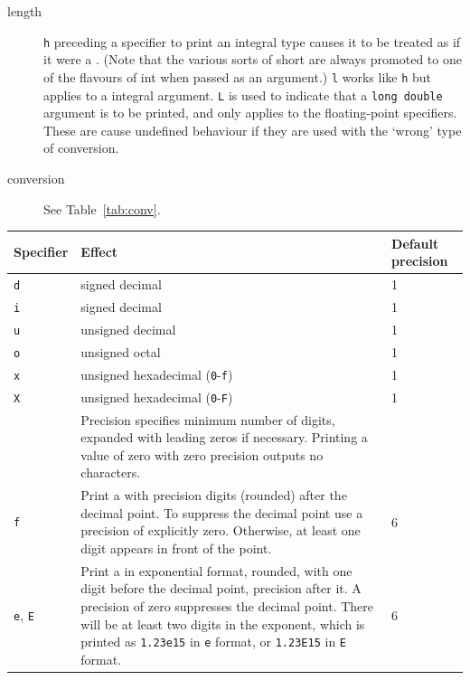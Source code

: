 \begin{description}
   \item[length] \texttt{h} preceding a specifier to print an integral type  causes
    it  to  be treated as if it were a \short.  (Note that the
    various sorts of short are always promoted to one of  the flavours of int
    when passed as an argument.) \texttt{l} works like \texttt{h} but
    applies to a \klong{} integral argument.  \texttt{L} is used
    to indicate  that  a  \texttt{long double} argument is to be printed,
    and only applies to the floating-point specifiers.  These are  cause
    undefined behaviour if they are used with the `wrong' type of
    conversion.

   \item[conversion] See Table~\ref{tab:conv}.
   \end{description}

   \begin{table}[htb]
     \centering
     \begin{tabular}{lp{}p{}}
       \toprule
        Specifier & Effect & Default precision    \\
        \midrule
        \texttt{d} & signed decimal & 1    \\
        \texttt{i} & signed decimal & 1    \\
        \texttt{u} & unsigned decimal & 1    \\
        \texttt{o} & unsigned octal & 1    \\
        \texttt{x} & unsigned hexadecimal (\texttt{0}-\texttt{f}) & 1    \\
        \texttt{X} & unsigned hexadecimal (\texttt{0}-\texttt{F}) & 1    \\
                  & Precision specifies minimum number of digits, expanded
                    with leading zeros if necessary.  Printing a value
                    of zero with zero precision outputs no characters. &     \\
        \texttt{f} & Print a \double{} with precision
                     digits (rounded) after the decimal point.  To suppress
                     the decimal point use a precision of explicitly zero.
                     Otherwise, at least one digit
                     appears in front of the point. & 6    \\

        \texttt{e},
        \texttt{E} & Print a \double{} in exponential format,
                     rounded, with one digit before the decimal point,
                     precision after it.  A
                     precision of zero suppresses the decimal point.
                     There will be at least two digits in the exponent,
                     which is printed as
                     \texttt{1.23e15} in \texttt{e} format, or \texttt{1.23E15}
                     in \texttt{E} format. & 6    \\


\end{tabular}
\end{table}
